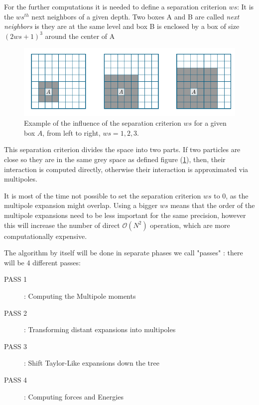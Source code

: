 \documentclass[12pt,twoside,a4paper]{report}
\begin{document}
	For the further computations it is needed to define a separation criterion $ws$: It is the $ws^{th}$ next neighbors of a given depth. Two boxes A and B are called \textit{next neighbors} is they are at the same level and box B is enclosed by a box of size $(2 ws + 1)^3$ around the center of A 
	
	
	
	
	\begin{figure}[H]
    \includegraphics[scale=0.7]{separation}    
    \centering 
    \caption{Example of the influence of the separation criterion $ws$ for a given box $A$, from left to right, $ws = 1,2,3$.}    
    \label{fig:separation}
     \end{figure}
	
		This separation criterion divides the space into two parts. If two particles are close so they are in the same grey space as defined figure (\ref{fig:separation}), then, their interaction is computed directly, otherwise their interaction is approximated via multipoles.
	
	It is most of the time not possible to set the separation criterion $ws$ to 0, as the multipole expansion might overlap. Using a bigger $ws$ means that the order of the multipole expansions need to be less important for the same precision, however this will increase the number of direct $\mathcal{O}(N^2)$ operation, which are  more computationally expensive.       
    
    
	The algorithm by itself will be done in separate phases we call "passes" : there will be 4 different passes:
	
	\begin{description}
	\item[PASS 1] : Computing the Multipole moments
	\item[PASS 2] : Transforming distant expansions into multipoles
	\item[PASS 3] : Shift Taylor-Like expansions down the tree
	\item[PASS 4] : Computing forces and Energies
	
	\end{description}
		
\end{document}
